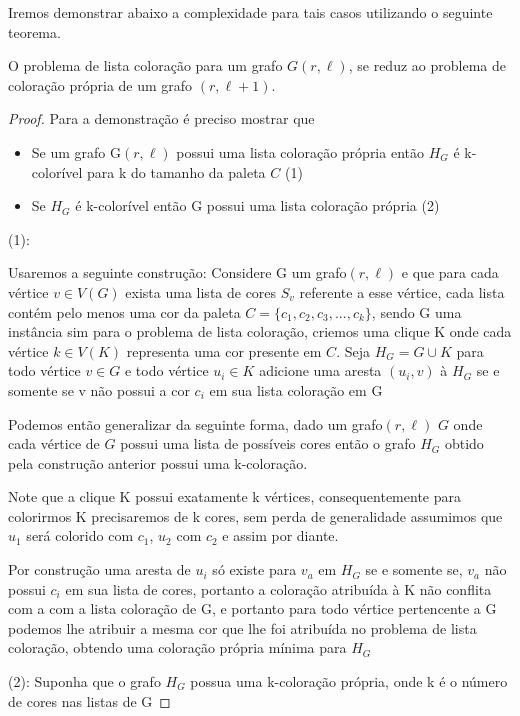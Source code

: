 Iremos demonstrar abaixo a complexidade para tais casos utilizando o seguinte teorema. 
\begin{teorema}
\label{theorem:list-coloring}
	O problema de lista coloração para um grafo $G(r,\ell)$, se reduz ao problema de coloração própria de um grafo $(r,\ell+1)$.
\end{teorema}
\begin{proof}
	Para a demonstração é preciso mostrar que
	\begin{itemize}
		\item Se um grafo G$(r,\ell)$ possui uma lista coloração própria então $H_G$ é k-colorível para k do tamanho da paleta $C$ (1)
		\item Se $H_G$ é k-colorível então G possui uma lista coloração própria (2)
	\end{itemize}
	(1):\newline
	
	Usaremos a seguinte construção:\newline
	Considere G um grafo$(r,\ell)$ e que para cada vértice $v \in V(G)$ exista uma lista de cores $S_v$ referente a esse vértice, cada lista contém pelo menos uma cor da paleta $C = \{c_1,c_2,c_3,...,c_k \}$, sendo G uma instância sim para o problema de lista coloração, criemos uma clique K onde cada vértice $k \in V(K)$ representa uma cor presente em $C$. Seja $H_G = G \cup K$ para todo vértice $v \in G$ e todo vértice $u_i \in K$ adicione uma aresta $(u_i,v)$ à $H_G$ se e somente se v não possui a cor $c_i$ em sua lista coloração em G
	
	Podemos então generalizar da seguinte forma, dado um grafo$(r,\ell)$ $G$ onde cada vértice de $G$ possui uma lista de possíveis cores então o grafo $H_G$ obtido pela construção anterior possui uma k-coloração.
	
	Note que a clique K possui exatamente k vértices, consequentemente para colorirmos K precisaremos de k cores, sem perda de generalidade assumimos que $u_1$ será colorido com $c_1$, $u_2$ com $c_2$ e assim por diante.
	
	Por construção uma aresta de $u_i$ só existe para $v_a$ em $H_G$ se e somente se, $v_a$ não possui $c_i$ em sua lista de cores, portanto a coloração atribuída à K não conflita com a com a lista coloração de G, e portanto para todo vértice pertencente a G podemos lhe atribuir a mesma cor que lhe foi atribuída no problema de lista coloração, obtendo uma coloração própria mínima para $H_G$
	
	(2):\newline
	Suponha que o grafo $H_G$ possua uma k-coloração própria, onde k é o número de cores nas listas de G
	

\end{proof}
